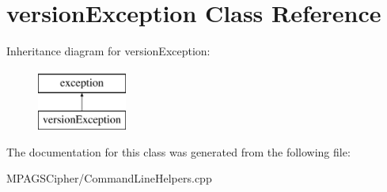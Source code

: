 \hypertarget{classversion_exception}{\section{version\-Exception Class Reference}
\label{classversion_exception}
}
Inheritance diagram for version\-Exception\-:\begin{figure}[H]
\begin{center}
\leavevmode
\includegraphics[height=2.000000cm]{classversion_exception}
\end{center}
\end{figure}


The documentation for this class was generated from the following file\-:\begin{DoxyCompactItemize}
\item 
M\-P\-A\-G\-S\-Cipher/Command\-Line\-Helpers.\-cpp\end{DoxyCompactItemize}
